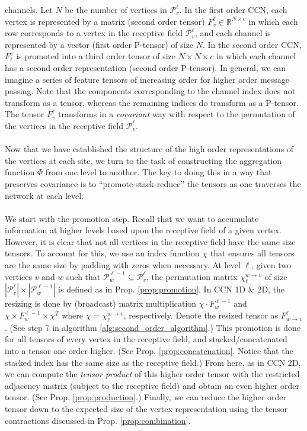 \documentclass[sigchi]{acmart}
\theoremstyle{definition}
\theoremstyle{theorem}
\theoremstyle{corollary}
\theoremstyle{lemma}
\theoremstyle{remark}
\theoremstyle{prop}
\begin{document}
channels. Let $N$ be the number of vertices in $\mathcal{P}_v^\ell$. In the first order CCN, each vertex is represented by a matrix (second order tensor) $F_v^\ell \in \mathbb{R}^{N \times c}$ in which each row corresponds to a vertex in the receptive field $\mathcal{P}_v^\ell$, and each channel is represented by a vector (first order P-tensor) of size $N$. In the second order CCN, $F_\ell^v$ is promoted into a third order tensor of size $N \times N \times c$ in which each channel has a second order representation (second order P-tensor). In general, we can imagine a series of feature tensors of increasing order for higher order message passing. Note that the components corresponding to the channel index does not transform as a tensor, whereas the remaining indices do transform as a P-tensor. The tensor $F_v^\ell$ transforms in a \textit{covariant} way with respect to the permutation of the vertices in the receptive field $\mathcal{P}_v^\ell$. \\ \\
Now that we have established the structure of the high order representations of the vertices at each site, we turn to the task of constructing the aggregation function $\Phi$ from one level to another. The key to doing this in a way that preserves covariance is to ``promote-stack-reduce'' the tensors as one traverses the network at each level. \\ \\
We start with the promotion step. Recall that we want to accumulate information at higher levels based upon the receptive field of a given vertex. However, it is clear that not all vertices in the receptive field have the same size tensors. To account for this, we use an index function $\chi$ that ensures all tensors are the same size by padding with zeros when necessary. At level $\ell$, given two vertices $v$ and $w$ such that $\mathcal{P}_w^{\ell - 1} \subseteq \mathcal{P}_v^\ell$, the permutation matrix $\chi_{\ell}^{w \rightarrow v}$ of size $|\mathcal{P}_v^\ell| \times |\mathcal{P}_w^{\ell - 1}|$ is defined as in Prop. \ref{prop:promotion}. In CCN 1D \& 2D, the resizing is done by (broadcast) matrix multiplication $\chi \cdot F_w^{\ell - 1}$ and $\chi \times F_w^{\ell - 1} \times \chi^T$ where $\chi = \chi_{\ell}^{w \rightarrow v}$, respectively. Denote the resized tensor as $F_{w \rightarrow v}^\ell$. (See step 7 in algorithm \ref{alg:second_order_algorithm}.) This promotion is done for all tensors of every vertex in the receptive field, and stacked/concatenated into a tensor one order higher. (See Prop. \ref{prop:concatenation}. Notice that the stacked index has the same size as the receptive field.) From here, as in CCN 2D, we can compute the \textit{tensor product} of this higher order tensor with the restricted adjacency matrix (subject to the receptive field) and obtain an even higher order tensor. (See Prop. \ref{prop:production}.) Finally, we can reduce the higher order tensor down to the expected size of the vertex representation using the tensor contractions discussed in Prop. \ref{prop:combination}. \\ \\
\end{document}
